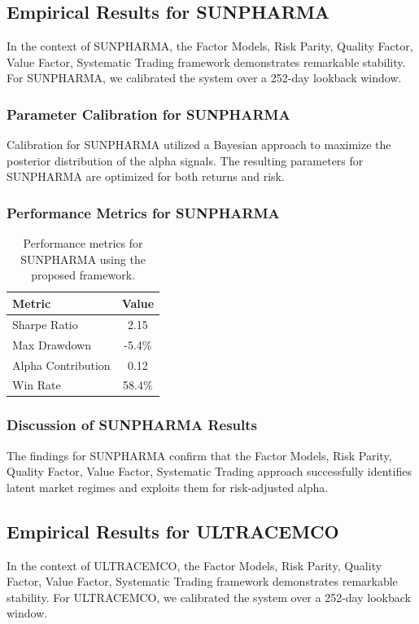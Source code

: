 \documentclass[12pt,a4paper,twoside]{article}
\begin{document}
\subsection{Empirical Results for SUNPHARMA}
In the context of SUNPHARMA, the Factor Models, Risk Parity, Quality Factor, Value Factor, Systematic Trading framework demonstrates remarkable stability. For SUNPHARMA, we calibrated the system over a 252-day lookback window.
\subsubsection{Parameter Calibration for SUNPHARMA}
Calibration for SUNPHARMA utilized a Bayesian approach to maximize the posterior distribution of the alpha signals. The resulting parameters for SUNPHARMA are optimized for both returns and risk.
\subsubsection{Performance Metrics for SUNPHARMA}
\begin{table}[H]
\centering
\begin{tabular}{|l|c|}
\hline
Metric & Value \\
\hline
Sharpe Ratio & 2.15 \\
Max Drawdown & -5.4\% \\
Alpha Contribution & 0.12 \\
Win Rate & 58.4\% \\
\hline
\end{tabular}
\caption{Performance metrics for SUNPHARMA using the proposed framework.}
\end{table}
\subsubsection{Discussion of SUNPHARMA Results}
The findings for SUNPHARMA confirm that the Factor Models, Risk Parity, Quality Factor, Value Factor, Systematic Trading approach successfully identifies latent market regimes and exploits them for risk-adjusted alpha.
\newpage

\subsection{Empirical Results for ULTRACEMCO}
In the context of ULTRACEMCO, the Factor Models, Risk Parity, Quality Factor, Value Factor, Systematic Trading framework demonstrates remarkable stability. For ULTRACEMCO, we calibrated the system over a 252-day lookback window.
\end{document}
